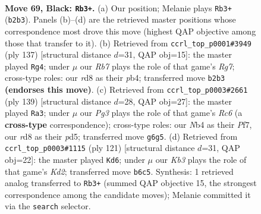 \documentclass[11pt]{article}
\begin{document}
\clearpage

\begin{figure}[p]\centering
\begin{subfigure}{0.46\textwidth}\centering
\resizebox{\linewidth}{!}{%
\newchessgame
\chessboard[
  setfen={3R4/1p2R2p/1k4pP/5p2/pn3P2/6K1/1r6/8 b - - 3 69},
  showmover=false,
  pgfstyle=straightmove, color=movearrow, markmove={b2-b3}
]}
\caption{}
\end{subfigure}\hfill
\begin{subfigure}{0.46\textwidth}\centering
\resizebox{\linewidth}{!}{%
\newchessgame
\chessboard[
  setfen={8/3k4/5Rp1/5p1p/1P3P1P/8/6r1/2K5 b - - 4 69},
  showmover=false,
  pgfstyle=straightmove, color=movearrow, markmove={g2-g4}
]}
\caption{}
\end{subfigure}
\\[4pt]
\begin{subfigure}{0.46\textwidth}\centering
\resizebox{\linewidth}{!}{%
\newchessgame
\chessboard[
  setfen={8/P3kp2/1R1p4/2pP4/1p2K3/2r5/5P2/8 b - - 4 70},
  showmover=false,
  pgfstyle=straightmove, color=movearrow, markmove={c3-a3}
]}
\caption{}
\end{subfigure}\hfill
\begin{subfigure}{0.46\textwidth}\centering
\resizebox{\linewidth}{!}{%
\newchessgame
\chessboard[
  setfen={8/3k2p1/7p/3P1K1P/5P2/8/p5R1/r7 b - - 18 61},
  showmover=false,
  pgfstyle=straightmove, color=movearrow, markmove={d7-d6}
]}
\caption{}
\end{subfigure}
\caption{\textbf{Move 69, Black: \texttt{Rb3+}.} (a) Our position; Melanie plays \texttt{Rb3+} (\texttt{b2b3}). Panels (b)--(d) are the retrieved master positions whose correspondence most drove this move (highest QAP objective among those that transfer to it). (b) Retrieved from \texttt{ccrl\_top\_p0001\#3949} (ply 137) [structural distance $d$=31, QAP obj=15]: the master played \texttt{Rg4}; under $\mu$ our \emph{Rb7} plays the role of that game's \emph{Rg7}; cross-type roles: our \emph{r}d8 as their \emph{p}b4; transferred move \texttt{b2b3} \textbf{(endorses this move)}. (c) Retrieved from \texttt{ccrl\_top\_p0003\#2661} (ply 139) [structural distance $d$=28, QAP obj=27]: the master played \texttt{Ra3}; under $\mu$ our \emph{Pg3} plays the role of that game's \emph{Rc6} (a \textbf{cross-type} correspondence); cross-type roles: our \emph{N}b4 as their \emph{P}f7, our \emph{r}d8 as their \emph{p}d5; transferred move \texttt{g6g5}. (d) Retrieved from \texttt{ccrl\_top\_p0003\#1115} (ply 121) [structural distance $d$=31, QAP obj=22]: the master played \texttt{Kd6}; under $\mu$ our \emph{Kb3} plays the role of that game's \emph{Kd2}; transferred move \texttt{b6c5}. Synthesis: 1 retrieved analog transferred to \texttt{Rb3+} (summed QAP objective 15, the strongest correspondence among the candidate moves); Melanie committed it via the \texttt{search} selector.}
\label{fig:thought-m137}
\end{figure}
\end{document}
